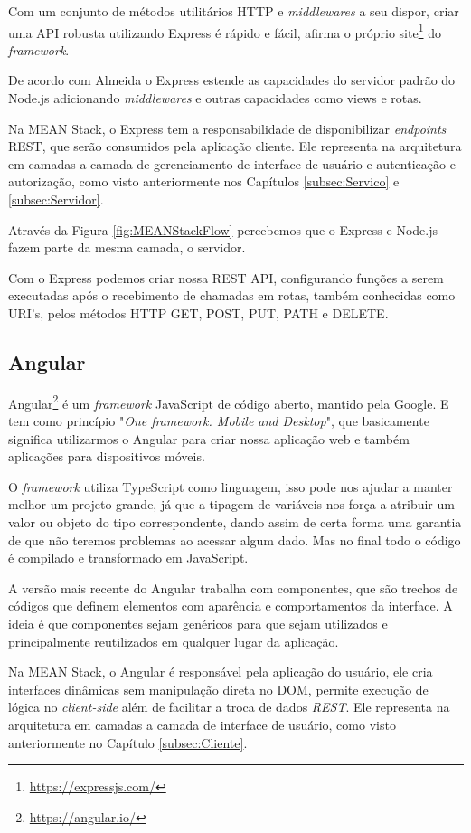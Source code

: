 \documentclass[
	12pt,				%
	openright,			%
	twoside,			%
	a4paper,			%
	english,			%
	brazil				%
	]{abntex2}
\begin{document}
Com um conjunto de métodos utilitários HTTP e \textit{middlewares} a seu dispor, criar uma API robusta utilizando Express é rápido e fácil, afirma o próprio site\footnote{\url{https://expressjs.com/}} do \textit{framework}.

De acordo com Almeida\cite{flavioalmeida_meanstack} o Express estende as capacidades do servidor padrão do Node.js adicionando \textit{middlewares} e outras capacidades como views e rotas.

Na MEAN Stack, o Express tem a responsabilidade de disponibilizar \textit{endpoints} REST, que serão consumidos pela aplicação cliente. Ele representa na arquitetura em camadas a camada de gerenciamento de interface de usuário e autenticação e autorização, como visto anteriormente nos Capítulos \ref{subsec:Servico} e \ref{subsec:Servidor}.

Através da Figura \ref{fig:MEANStackFlow} percebemos que o Express e Node.js fazem parte da mesma camada, o servidor.

Com o Express podemos criar nossa REST API, configurando funções a serem executadas após o recebimento de chamadas em rotas, também conhecidas como URI's, pelos métodos HTTP GET, POST, PUT, PATH e DELETE.

\subsection{Angular}

Angular\footnote{\url{https://angular.io/}} é um \textit{framework} JavaScript de código aberto, mantido pela Google. E tem como princípio "\textit{One framework. Mobile and Desktop}", que basicamente significa utilizarmos o Angular para criar nossa aplicação web e também aplicações para dispositivos móveis.

O \textit{framework} utiliza TypeScript como linguagem, isso pode nos ajudar a manter melhor um projeto grande, já que a tipagem de variáveis nos força a atribuir um valor ou objeto do tipo correspondente, dando assim de certa forma uma garantia de que não teremos problemas ao acessar algum dado. Mas no final todo o código é compilado e transformado em JavaScript.

A versão mais recente do Angular trabalha com componentes, que são trechos de códigos que definem elementos com aparência e comportamentos da interface. A ideia é que componentes sejam genéricos para que sejam utilizados e principalmente reutilizados em qualquer lugar da aplicação.

Na MEAN Stack, o Angular é responsável pela aplicação do usuário, ele cria interfaces dinâmicas sem manipulação direta no DOM, permite execução de lógica no \textit{client-side} além de facilitar a troca de dados \textit{REST}. Ele representa na arquitetura em camadas a camada de interface de usuário, como visto anteriormente no Capítulo \ref{subsec:Cliente}.
\end{document}
